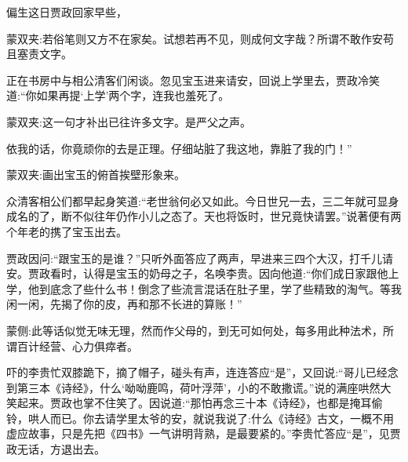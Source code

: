 \begin{parag}
    偏生这日贾政回家早些，\begin{note}蒙双夹:若俗笔则又方不在家矣。试想若再不见，则成何文字哉？所谓不敢作安苟且塞责文字。\end{note}正在书房中与相公清客们闲谈。忽见宝玉进来请安，回说上学里去，贾政冷笑道:“你如果再提‘上学’两个字，连我也羞死了。\begin{note}蒙双夹:这一句才补出已往许多文字。是严父之声。\end{note}依我的话，你竟顽你的去是正理。仔细站脏了我这地，靠脏了我的门！”\begin{note}蒙双夹:画出宝玉的俯首挨壁形象来。\end{note}众清客相公们都早起身笑道:“老世翁何必又如此。今日世兄一去，三二年就可显身成名的了，断不似往年仍作小儿之态了。天也将饭时，世兄竟快请罢。”说著便有两个年老的携了宝玉出去。
\end{parag}


\begin{parag}
    贾政因问:“跟宝玉的是谁？”只听外面答应了两声，早进来三四个大汉，打千儿请安。贾政看时，认得是宝玉的奶母之子，名唤李贵。因向他道:“你们成日家跟他上学，他到底念了些什么书！倒念了些流言混话在肚子里，学了些精致的淘气。等我闲一闲，先揭了你的皮，再和那不长进的算账！”\begin{note}蒙侧:此等话似觉无味无理，然而作父母的，到无可如何处，每多用此种法术，所谓百计经营、心力俱瘁者。\end{note}吓的李贵忙双膝跪下，摘了帽子，碰头有声，连连答应“是”，又回说:“哥儿已经念到第三本《诗经》，什么‘呦呦鹿鸣，荷叶浮萍’，小的不敢撒谎。”说的满座哄然大笑起来。贾政也掌不住笑了。因说道:“那怕再念三十本《诗经》，也都是掩耳偷铃，哄人而已。你去请学里太爷的安，就说我说了:什么《诗经》古文，一概不用虚应故事，只是先把《四书》一气讲明背熟，是最要紧的。”李贵忙答应“是”，见贾政无话，方退出去。
\end{parag}


